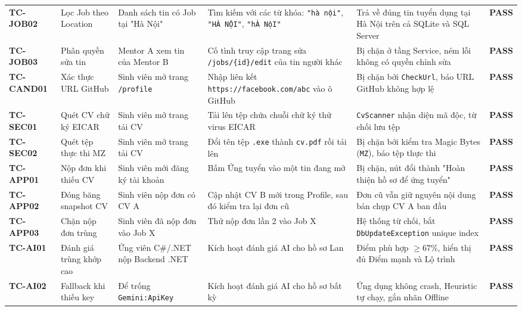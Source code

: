 {\begin{longtable}{p{1.6cm} p{2.2cm} p{2.7cm} p{3.4cm} p{3.4cm} c}
\addlinespace
\textbf{TC-JOB02} & Lọc Job theo Location & Danh sách tin có Job tại "Hà Nội" & Tìm kiếm với các từ khóa: \texttt{"hà nội"}, \texttt{"HÀ NỘI"}, \texttt{"hÀ NộI"} & Trả về đúng tin tuyển dụng tại Hà Nội trên cả SQLite và SQL Server & \textbf{PASS} \\
\addlinespace
\textbf{TC-JOB03} & Phân quyền sửa tin & Mentor A xem tin của Mentor B & Cố tình truy cập trang sửa \texttt{/jobs/\{id\}/edit} của tin người khác & Bị chặn ở tầng Service, ném lỗi không có quyền chỉnh sửa & \textbf{PASS} \\
\midrule
\textbf{TC-CAND01} & Xác thực URL GitHub & Sinh viên mở trang \texttt{/profile} & Nhập liên kết \texttt{https://facebook.com/abc} vào ô GitHub & Bị chặn bởi \texttt{CheckUrl}, báo URL GitHub không hợp lệ & \textbf{PASS} \\
\addlinespace
\textbf{TC-SEC01} & Quét CV chữ ký EICAR & Sinh viên mở trang tải CV & Tải lên tệp chứa chuỗi chữ ký thử virus EICAR & \texttt{CvScanner} nhận diện mã độc, từ chối lưu tệp & \textbf{PASS} \\
\addlinespace
\textbf{TC-SEC02} & Quét tệp thực thi MZ & Sinh viên mở trang tải CV & Đổi tên tệp \texttt{.exe} thành \texttt{cv.pdf} rồi tải lên & Bị chặn bởi kiểm tra Magic Bytes (\texttt{MZ}), báo tệp thực thi & \textbf{PASS} \\
\midrule
\textbf{TC-APP01} & Nộp đơn khi thiếu CV & Sinh viên mới đăng ký tài khoản & Bấm Ứng tuyển vào một tin đang mở & Bị chặn, nút đổi thành "Hoàn thiện hồ sơ để ứng tuyển" & \textbf{PASS} \\
\addlinespace
\textbf{TC-APP02} & Đóng băng snapshot CV & Sinh viên nộp đơn có CV A & Cập nhật CV B mới trong Profile, sau đó kiểm tra lại đơn cũ & Đơn cũ vẫn giữ nguyên nội dung bản chụp CV A ban đầu & \textbf{PASS} \\
\addlinespace
\textbf{TC-APP03} & Chặn nộp đơn trùng & Sinh viên đã nộp đơn vào Job X & Thử nộp đơn lần 2 vào Job X & Hệ thống từ chối, bắt \texttt{DbUpdateException} unique index & \textbf{PASS} \\
\midrule
\textbf{TC-AI01} & Đánh giá trùng khớp cao & Ứng viên C\#/.NET nộp Backend .NET & Kích hoạt đánh giá AI cho hồ sơ Lan & Điểm phù hợp $\ge 67\%$, hiển thị đủ Điểm mạnh và Lộ trình & \textbf{PASS} \\
\addlinespace
\textbf{TC-AI02} & Fallback khi thiếu key & Để trống \texttt{Gemini:ApiKey} & Kích hoạt đánh giá AI cho hồ sơ bất kỳ & Ứng dụng không crash, Heuristic tự chạy, gắn nhãn Offline & \textbf{PASS} \\

\end{longtable}}
